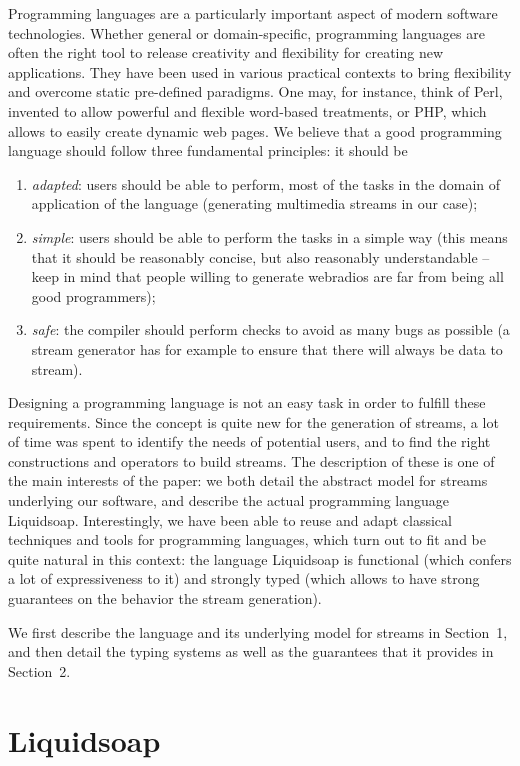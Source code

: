 \documentclass{llncs}
\begin{document}
Programming languages are a particularly important aspect of modern software
technologies.  Whether general or domain-specific, programming languages are
often the right tool to release creativity and flexibility for creating new
applications. They have been used in various practical contexts to bring
flexibility and overcome static pre-defined paradigms. One may, for instance,
think of Perl, invented to allow powerful and flexible word-based treatments, or
PHP, which allows to easily create dynamic web pages. We believe that a good
programming language should follow three fundamental principles: it should be
\begin{enumerate}
\item \emph{adapted}: users should be able to perform, most of the tasks in the
  domain of application of the language (generating multimedia streams in our
  case);
\item \emph{simple}: users should be able to perform the tasks in a simple way
  (this means that it should be reasonably concise, but also reasonably
  understandable -- keep in mind that people willing to generate webradios are
  far from being all good programmers);
\item \emph{safe}: the compiler should perform checks to avoid as many bugs as
  possible (a stream generator has for example to ensure that there will always
  be data to stream).
\end{enumerate}
Designing a programming language is not an easy task in order to fulfill these
requirements. Since the concept is quite new for the generation of streams, a
lot of time was spent to identify the needs of potential users, and to find the
right constructions and operators to build streams. The description of these is
one of the main interests of the paper: we both detail the abstract model for
streams underlying our software, and describe the actual programming language
Liquidsoap. Interestingly, we have been able to reuse and adapt classical
techniques and tools for programming languages, which turn out to fit and be
quite natural in this context: the language Liquidsoap is functional (which
confers a lot of expressiveness to it) and strongly typed (which allows to have
strong guarantees on the behavior the stream generation).

We first describe the language and its underlying model for streams in
Section~1, and then detail the typing systems as well as the guarantees that it
provides in Section~2.

\section{Liquidsoap}
\end{document}
